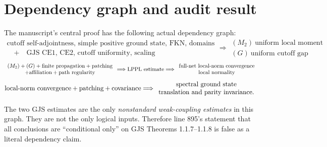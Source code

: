 \documentclass[10pt,a4paper]{article}
\begin{document}
\section{Dependency graph and audit result}

The manuscript's central proof has the following actual dependency graph:
\[
\begin{array}{c}
\text{cutoff self-adjointness, simple positive ground state, FKN, domains}\\
\quad+\quad\text{GJS CE1, CE2, cutoff uniformity, scaling}
\end{array}
\Longrightarrow
\begin{array}{c}
(M_2)\ \text{uniform local moment}\\
(G)\ \text{uniform cutoff gap}
\end{array}
\]
\[
\begin{array}{c}
(M_2)+(G)+\text{finite propagation}+\text{patching}\\
+\text{affiliation}+\text{path regularity}
\end{array}
\Longrightarrow
\text{LPPL estimate}
\Longrightarrow
\begin{array}{c}
\text{full-net local-norm convergence}\cr
\text{local normality}
\end{array}
\]
\[
\text{local-norm convergence}+\text{patching}+\text{covariance}
\Longrightarrow
\begin{array}{c}
\text{spectral ground state}\cr
\text{translation and parity invariance.}
\end{array}
\]

The two GJS estimates are the only \emph{nonstandard weak-coupling estimates} in this
graph.  They are not the only logical inputs.  Therefore line 895's statement that all
conclusions are ``conditional only'' on GJS Theorems 1.1.7--1.1.8 is false as a literal
dependency claim.
\end{document}
